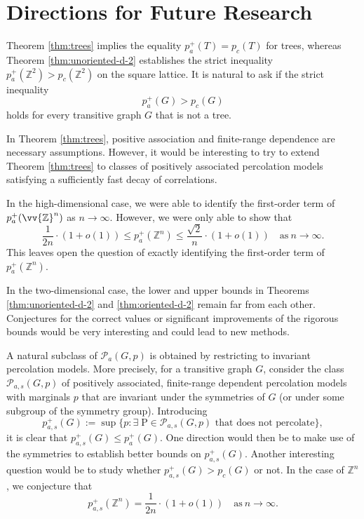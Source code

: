\documentclass[11pt]{article}
\renewcommand{\P}{\mathrm{P}}
\newcommand{\Z}{\mathbb{Z}}
\theoremstyle{remark}
\begin{document}
\section{Directions for Future Research}\label{sec:open-questions}

Theorem \ref{thm:trees} implies the equality $p_{a}^{+}(T)=p_{c}(T)$ for trees, whereas Theorem \ref{thm:unoriented-d-2} establishes the strict inequality $p_{a}^{+}(\Z^2) > p_{c}(\Z^2)$ on the square lattice. It is natural to ask if the strict inequality
\begin{equation}
    p_{a}^{+}(G) > p_{c}(G)
\end{equation}
holds for every transitive graph $G$ that is not a tree.

In Theorem \ref{thm:trees}, positive association and finite-range dependence are necessary assumptions. However, it would be interesting to try to extend Theorem \ref{thm:trees} to classes of positively associated percolation models satisfying a sufficiently fast decay of correlations.


In the high-dimensional case, we were able to identify the first-order term of $p_a^+(\vv{\Z}^n)$ as $n \to \infty$. However, we were only able to show that 
\begin{equation}
   \frac{1}{2n} \cdot (1+o(1)) \le  p_a^+(\Z^n) \le \frac{\sqrt{2}}{n} \cdot (1+o(1)) \quad \text{as}\ n \to \infty.
\end{equation}
This leaves open the question of exactly identifying the first-order term of $p_a^+(\Z^n)$.

In the two-dimensional case, the lower and upper bounds in Theorems \ref{thm:unoriented-d-2} and \ref{thm:oriented-d-2} remain far from each other. Conjectures for the correct values or significant improvements of the rigorous bounds would be very interesting and could lead to new methods. 

A natural subclass of $\mathcal{P}_a(G,p)$ is obtained by restricting to invariant percolation models. More precisely, for a transitive graph $G$, consider the class $\mathcal{P}_{a,s}(G,p)$ of positively associated, finite-range dependent percolation models with marginals $p$ that are invariant under the symmetries of $G$ (or under some subgroup of the symmetry group). Introducing 
\begin{equation}
	p_{a,s}^{+}(G) := \sup\{p : \exists\; \P \in \mathcal{P}_{a,s}(G,p) \text{ that does not percolate}\},
\end{equation}
it is clear that $p_{a,s}^{+}(G) \le p_a^{+}(G)$. One direction would then be to make use of the symmetries to establish better bounds on $p_{a,s}^{+}(G)$. Another interesting question would be to study whether $p_{a,s}^{+}(G) > p_c(G)$ or not. In the case of $\Z^n$, we conjecture that 
\begin{equation}
   p_{a,s}^+(\Z^n) = \frac{1}{2n} \cdot (1+o(1)) \quad \text{as}\ n \to \infty.
\end{equation}

\small



\newpage

\appendix 

\end{document}
